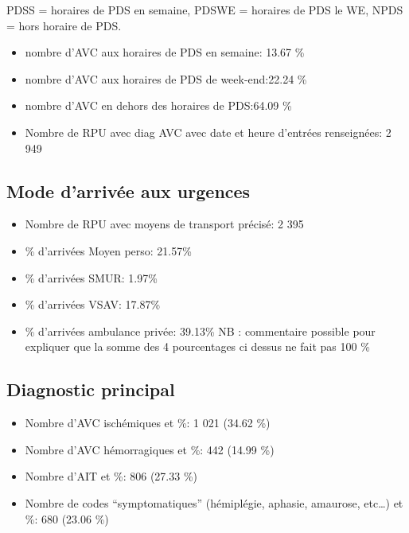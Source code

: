 \documentclass[]{article}
\begin{document}
PDSS = horaires de PDS en semaine, PDSWE = horaires de PDS le WE, NPDS =
hors horaire de PDS.

\begin{itemize}
\itemsep1pt\parskip0pt
\item
  nombre d'AVC aux horaires de PDS en semaine: 13.67 \%
\item
  nombre d'AVC aux horaires de PDS de week-end:22.24 \%
\item
  nombre d'AVC en dehors des horaires de PDS:64.09 \%
\item
  Nombre de RPU avec diag AVC avec date et heure d'entrées renseignées:
  2 949
\end{itemize}

\subsection{Mode d'arrivée aux
urgences}\label{mode-darrivee-aux-urgences}

\begin{itemize}
\itemsep1pt\parskip0pt
\item
  Nombre de RPU avec moyens de transport précisé: 2 395
\item
  \% d'arrivées Moyen perso: 21.57\%
\item
  \% d'arrivées SMUR: 1.97\%
\item
  \% d'arrivées VSAV: 17.87\%
\item
  \% d'arrivées ambulance privée: 39.13\% NB : commentaire possible pour
  expliquer que la somme des 4 pourcentages ci dessus ne fait pas 100 \%
\end{itemize}

\subsection{Diagnostic principal}\label{diagnostic-principal-1}

\begin{itemize}
\itemsep1pt\parskip0pt
\item
  Nombre d'AVC ischémiques et \%: 1 021 (34.62 \%)
\item
  Nombre d'AVC hémorragiques et \%: 442 (14.99 \%)
\item
  Nombre d'AIT et \%: 806 (27.33 \%)
\item
  Nombre de codes ``symptomatiques'' (hémiplégie, aphasie, amaurose,
  etc\ldots{}) et \%: 680 (23.06 \%)
\end{itemize}
\end{document}
